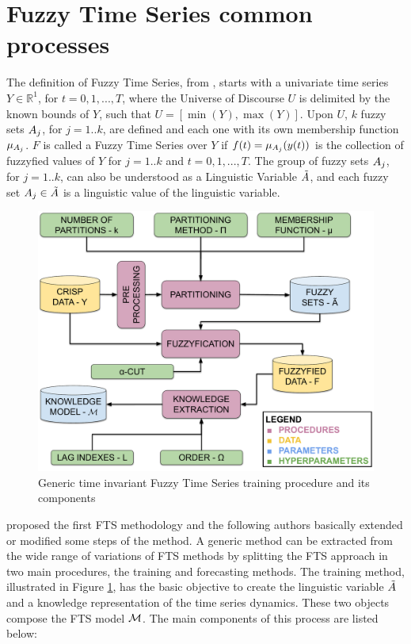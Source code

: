 \section{Fuzzy Time Series common processes}
\label{sec:common_fts} 


The definition of Fuzzy Time Series, from \cite{song1993fuzzy}, starts with a univariate time series $Y \in \mathbb{R}^1$, for $t = 0,1,...,T$, where the Universe of Discourse $U$ is delimited by the known bounds of $Y$, such that $U = [\min(Y),\max(Y)]$. Upon $U$, $k$ fuzzy sets $A_j$, for $j = 1..k$, are defined and each one with its own membership function $\mu_{A_j}$. $F$ is called a Fuzzy Time Series over $Y$ if $f(t) = \mu_{A_j}(y(t))$ is the collection of fuzzyfied values of $Y$ for $j = 1..k$ and $t = 0,1,...,T$. The group of fuzzy sets $A_j$, for $j = 1..k$, can also be understood as a Linguistic Variable $\tilde{A}$, and each fuzzy set $A_j \in \tilde{A}$ is a linguistic value of the linguistic variable. 

\begin{figure}[htb]
    \centering
    \includegraphics[width=\textwidth]{figures/fts_training.pdf}
    \caption{Generic time invariant Fuzzy Time Series training procedure and its components}
    \label{fig:fts_training}
\end{figure}

\cite{Song1993partI} proposed the first FTS methodology and the following authors basically extended or modified some steps of the method. A generic method can be extracted from the wide range of variations of FTS methods by splitting the FTS approach in two main procedures, the training and forecasting methods. The training method, illustrated in Figure \ref{fig:fts_training}, has the basic objective to create the linguistic variable $\tilde{A}$ and a knowledge representation of the time series dynamics. These two objects compose the FTS model $\mathcal{M}$. The main components of this process are listed below:

